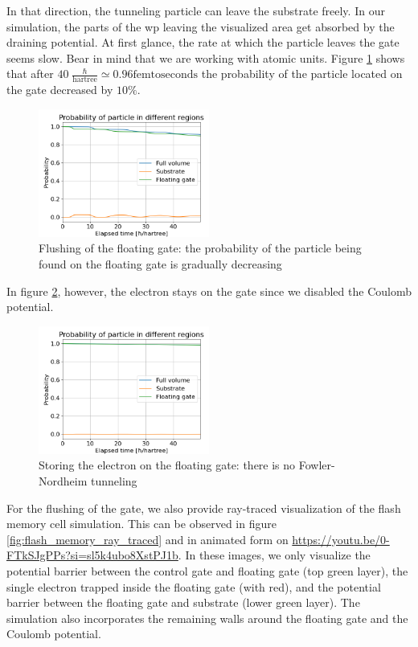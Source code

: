 In that direction, the tunneling particle can leave the substrate freely.
In our simulation, the parts of the \acrshort{wp} leaving the visualized area get absorbed by the draining potential.
At first glance, the rate at which the particle leaves the gate seems slow.
Bear in mind that we are working with atomic units.
Figure \ref{fig:flash_flush_plot} shows that after $40\;\frac{\hbar}{\text{hartree}} \simeq 0.96 \text{femtoseconds}$ the probability of the particle located on the gate decreased by $10\%$.
\begin{figure}[hbt!]
	\centering
	\includegraphics[width=0.5\textwidth]{figures/flash_flush.png}
	\caption{Flushing of the floating gate: the probability of the particle being found on the floating gate is gradually decreasing}
	\label{fig:flash_flush_plot}
\end{figure}
In figure \ref{fig:flash_keep}, however, the electron stays on the gate since we disabled the Coulomb potential.
\begin{figure}[hbt!]
	\centering
	\includegraphics[width=0.5\textwidth]{figures/flash_keep.png}
	\caption{Storing the electron on the floating gate: there is no Fowler-Nordheim tunneling}
	\label{fig:flash_keep}
\end{figure}
For the flushing of the gate, we also provide ray-traced visualization of the flash memory cell simulation.
This can be observed in figure \ref{fig:flash_memory_ray_traced} and in animated form on \url{https://youtu.be/0-FTkSJgPPs?si=sl5k4ubo8XstPJ1b}.
In these images, we only visualize the potential barrier between the control gate and floating gate (top green layer), the single electron trapped inside the floating gate (with red), and the potential barrier between the floating gate and substrate (lower green layer).
The simulation also incorporates the remaining walls around the floating gate and the Coulomb potential.

